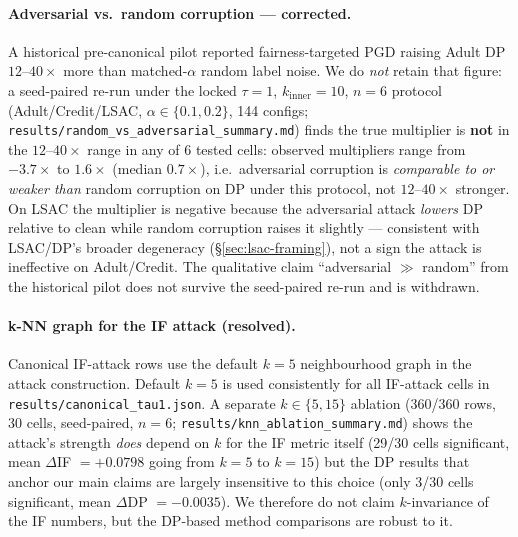 \paragraph{Adversarial vs.\ random corruption --- corrected.}
A historical pre-canonical pilot reported fairness-targeted PGD raising
Adult DP $12$--$40\times$ more than matched-$\alpha$ random label noise.
We do \emph{not} retain that figure: a seed-paired re-run under the
locked $\tau{=}1$, $k_{\mathrm{inner}}{=}10$, $n{=}6$ protocol
(Adult/Credit/LSAC, $\alpha\in\{0.1,0.2\}$, 144 configs;
\texttt{results/random\_vs\_adversarial\_summary.md}) finds the true
multiplier is \textbf{not} in the $12$--$40\times$ range in any of 6
tested cells: observed multipliers range from $-3.7\times$ to
$1.6\times$ (median $0.7\times$), i.e.\ adversarial corruption is
\emph{comparable to or weaker than} random corruption on DP under this
protocol, not $12$--$40\times$ stronger. On LSAC the multiplier is
negative because the adversarial attack \emph{lowers} DP relative to
clean while random corruption raises it slightly --- consistent with
LSAC/DP's broader degeneracy (\S\ref{sec:lsac-framing}), not a sign the
attack is ineffective on Adult/Credit. The qualitative claim
``adversarial $\gg$ random'' from the historical pilot does not survive
the seed-paired re-run and is withdrawn.

\paragraph{k-NN graph for the IF attack (resolved).}
Canonical IF-attack rows use the default $k{=}5$ neighbourhood graph in
the attack construction. Default $k{=}5$ is used consistently for all
IF-attack cells in \texttt{results/canonical\_tau1.json}. A separate
$k\in\{5,15\}$ ablation (360/360 rows, 30 cells, seed-paired,
$n{=}6$; \texttt{results/knn\_ablation\_summary.md}) shows the
attack's strength \emph{does} depend on $k$ for the IF metric itself
(29/30 cells significant, mean $\Delta$IF $=+0.0798$ going from
$k{=}5$ to $k{=}15$) but the DP results that anchor our main claims
are largely insensitive to this choice (only 3/30 cells significant,
mean $\Delta$DP $=-0.0035$). We therefore do not claim
$k$-invariance of the IF numbers, but the DP-based method comparisons
are robust to it.

